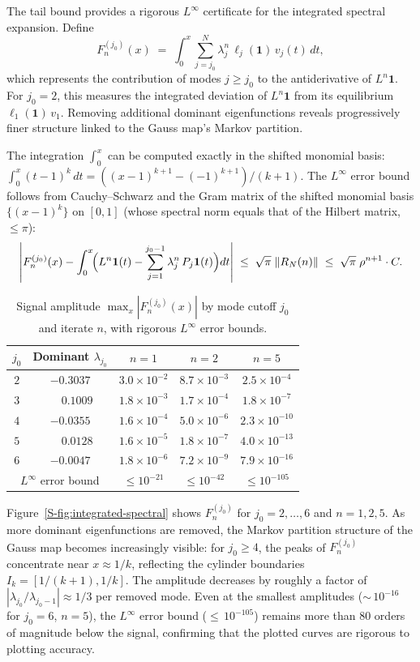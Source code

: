 \documentclass[11pt]{article}
\begin{document}
The tail bound provides a rigorous $L^\infty$ certificate for the integrated
spectral expansion.  Define
\[
F_n^{(j_0)}(x) \;=\; \int_0^x \sum_{j=j_0}^{N} \lambda_j^n \,\ell_j(\mathbf{1})\, v_j(t)\, dt,
\]
which represents the contribution of modes $j \geq j_0$ to the
antiderivative of $L^n \mathbf{1}$.  For $j_0 = 2$, this measures the
integrated deviation of $L^n\mathbf{1}$ from its equilibrium $\ell_1(\mathbf{1})\,v_1$.
Removing additional dominant eigenfunctions reveals progressively finer
structure linked to the Gauss map's Markov partition.

The integration $\int_0^x$ can be computed exactly in the shifted monomial
basis: $\int_0^x (t - 1)^k \,dt = ((x-1)^{k+1} - (-1)^{k+1})/(k+1)$.
The $L^\infty$ error bound follows from Cauchy--Schwarz and the Gram
matrix of the shifted monomial basis $\{(x-1)^k\}$ on $[0,1]$
(whose spectral norm equals that of the Hilbert matrix, $\leq \pi$):
\[
\left| F_n^{(j_0)}(x) - \int_0^x \!\Bigl(L^n\mathbf{1}(t)
  - \sum_{j=1}^{j_0-1} \lambda_j^n\,P_j\mathbf{1}(t)\Bigr) dt \right|
\;\leq\;
\sqrt{\pi}\;\|R_N(n)\|
\;\leq\; \sqrt{\pi}\;\rho^{n+1} \cdot C.
\]

\begin{table}[ht]
\centering
\caption{Signal amplitude $\max_x |F_n^{(j_0)}(x)|$ by mode cutoff $j_0$
  and iterate $n$, with rigorous $L^\infty$ error bounds.}
\label{S-tab:integrated-spectral}
\smallskip
\begin{tabular}{c c c c c}
\toprule
$j_0$ & Dominant $\lambda_{j_0}$ & $n=1$ & $n=2$ & $n=5$ \\
\midrule
$2$ & $-0.3037$ & $3.0 \times 10^{-2}$ & $8.7 \times 10^{-3}$ & $2.5 \times 10^{-4}$ \\
$3$ & $\phantom{-}0.1009$ & $1.8 \times 10^{-3}$ & $1.7 \times 10^{-4}$ & $1.8 \times 10^{-7}$ \\
$4$ & $-0.0355$ & $1.6 \times 10^{-4}$ & $5.0 \times 10^{-6}$ & $2.3 \times 10^{-10}$ \\
$5$ & $\phantom{-}0.0128$ & $1.6 \times 10^{-5}$ & $1.8 \times 10^{-7}$ & $4.0 \times 10^{-13}$ \\
$6$ & $-0.0047$ & $1.8 \times 10^{-6}$ & $7.2 \times 10^{-9}$ & $7.9 \times 10^{-16}$ \\
\midrule
\multicolumn{2}{c}{$L^\infty$ error bound} & $\leq 10^{-21}$ & $\leq 10^{-42}$ & $\leq 10^{-105}$ \\
\bottomrule
\end{tabular}
\end{table}

Figure~\ref{S-fig:integrated-spectral} shows $F_n^{(j_0)}$ for $j_0 = 2,\ldots,6$
and $n = 1, 2, 5$.  As more dominant eigenfunctions are removed, the
Markov partition structure of the Gauss map becomes increasingly visible:
for $j_0 \geq 4$, the peaks of $F_n^{(j_0)}$ concentrate near $x \approx 1/k$,
reflecting the cylinder boundaries $I_k = [1/(k+1), 1/k]$.
The amplitude decreases by roughly a factor of $|\lambda_{j_0}/\lambda_{j_0-1}|
\approx 1/3$ per removed mode.  Even at the smallest amplitudes
(${\sim}\,10^{-16}$ for $j_0 = 6$, $n = 5$), the $L^\infty$ error bound
(${\leq}\,10^{-105}$) remains more than $80$ orders of magnitude below
the signal, confirming that the plotted curves are rigorous to plotting
accuracy.
\end{document}
